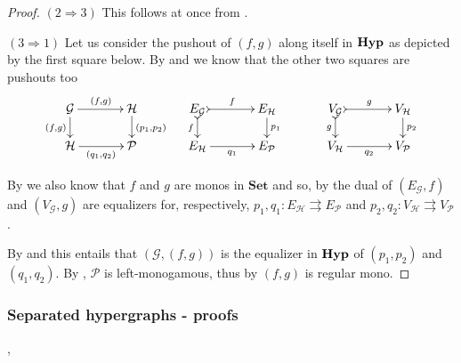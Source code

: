 \documentclass[3p]{elsarticle}
\newcommand{\Set}{\mathbf{Set}}
\newcommand{\catname}[1]{\textbf{\textup{#1}}}
\newcommand{\hyp}{\catname{Hyp}}
\theoremstyle{remark}
\theoremstyle{definition}
\begin{document}
\begin{proof}
	\smallskip \noindent
	$(2\Rightarrow 3)$ This follows at once from .
	
	\smallskip \noindent
	$(3\Rightarrow 1)$ Let us consider the pushout of $(f,g)$ along itself in $\hyp$ as depicted by the first square below. By  and  we know that the other two squares are pushouts too
	\[\xymatrix@C=35pt@R=15pt{\mathcal{G} \ar[r]^{(f,g)}  \ar[d]_{(f,g)}& \mathcal{H}\ar[d]^{(p_1, p_2)} & E_{\mathcal{G}} \ar@{>->}[d]_{f}\ar@{>->}[r]^{f} & E_{\mathcal{H}} \ar[d]^{p_1}& V_{\mathcal{G}}\ar@{>->}[r]^{g} \ar@{>->}[d]_{g} & V_{\mathcal{H}} \ar[d]^{p_2}\\\mathcal{H} \ar[r]_{(q_1, q_2)} & \mathcal{P} & E_{\mathcal{H}} \ar[r]_{q_1}& E_{\mathcal{P}} & V_{\mathcal{H}}\ar[r]_{q_2} & V_{\mathcal{P}}}\]
	
	 By  we also know that $f$ and $g$ are monos in $\Set$ and so, by the dual of  $(E_\mathcal{G}, f)$ and $(V_{\mathcal{G}}, g)$ are equalizers for, respectively, $p_1, q_1\colon E_{\mathcal{H}}\rightrightarrows E_{\mathcal{P}}$ and $p_2, q_2\colon V_{\mathcal{H}}\rightrightarrows V_{\mathcal{P}}$.
	
	By  and  this entails that $(\mathcal{G}, (f,g))$ is the equalizer in $\hyp$ of $(p_1, p_2)$ and $(q_1, q_2)$. By , $\mathcal{P}$ is left-monogamous, thus by  $(f,g)$ is regular mono.
\end{proof} 

\subsubsection{Separated hypergraphs - proofs}

\sep*
\end{document}
